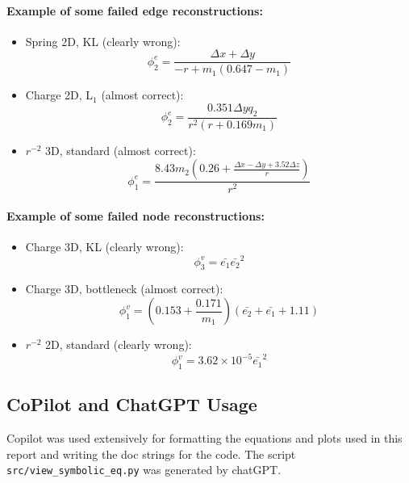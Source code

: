 \documentclass[11pt]{article}
\begin{document}
\paragraph*{Example of some failed edge reconstructions:}
\begin{itemize}
    \item 

    Spring 2D, KL (clearly wrong):
    $$
    \phi^{e}_2 = \frac{\Delta x + \Delta y}{-r + m_1 ( 0.647 - m_1)}
    $$
    \item
    Charge 2D, L$_1$ (almost correct):
    $$
    \phi^{e}_2 = \frac{0.351\Delta y q_2}{r^2(r+0.169m_1)}
    $$
    \item
    $r^{-2}$ 3D, standard (almost correct):
    $$
    \phi^{e}_1 = \frac{8.43m_2(0.26+\frac{\Delta x - \Delta y + 3.52\Delta z}{r})}{r^2}
    $$
\end{itemize}
\paragraph{Example of some failed node reconstructions:}
\begin{itemize}
    \item 
    Charge 3D, KL (clearly wrong):
    $$
    \phi^{v}_3 = \bar{e_1}\bar{e_2}^2
    $$
    \item
    Charge 3D, bottleneck (almost correct):
    $$
    \phi^{v}_1 = (0.153 + \frac{0.171}{m_1})(\bar{e_2} + \bar{e_1} + 1.11)
    $$
    \item
    $r^{-2}$ 2D, standard (clearly wrong):
    $$
    \phi^{v}_1 = 3.62 \times 10^{-5} \bar{e_1}^2
    $$
\end{itemize}

\subsection{CoPilot and ChatGPT Usage}
Copilot was used extensively for formatting the equations and plots used in this report and writing the doc strings for the code. The script \texttt{src/view\_symbolic\_eq.py} was generated by chatGPT.



    

  
\end{document}
